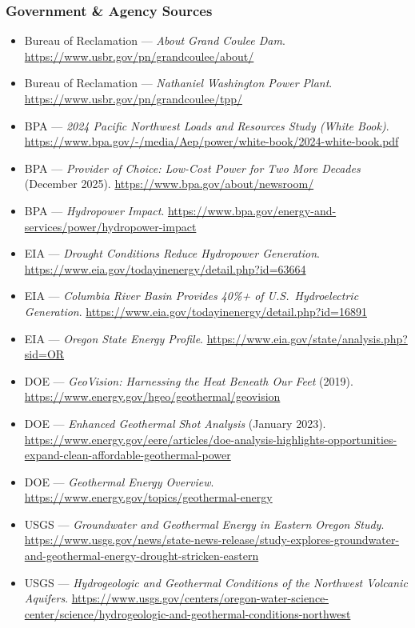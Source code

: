 \documentclass[11pt,letterpaper]{article}
\begin{document}
\subsubsection{Government \& Agency Sources}
\begin{itemize}[leftmargin=2em]
\item Bureau of Reclamation --- \textit{About Grand Coulee Dam}. \url{https://www.usbr.gov/pn/grandcoulee/about/}
\item Bureau of Reclamation --- \textit{Nathaniel Washington Power Plant}. \url{https://www.usbr.gov/pn/grandcoulee/tpp/}
\item BPA --- \textit{2024 Pacific Northwest Loads and Resources Study (White Book)}. \url{https://www.bpa.gov/-/media/Aep/power/white-book/2024-white-book.pdf}
\item BPA --- \textit{Provider of Choice: Low-Cost Power for Two More Decades} (December 2025). \url{https://www.bpa.gov/about/newsroom/}
\item BPA --- \textit{Hydropower Impact}. \url{https://www.bpa.gov/energy-and-services/power/hydropower-impact}
\item EIA --- \textit{Drought Conditions Reduce Hydropower Generation}. \url{https://www.eia.gov/todayinenergy/detail.php?id=63664}
\item EIA --- \textit{Columbia River Basin Provides 40\%+ of U.S.\ Hydroelectric Generation}. \url{https://www.eia.gov/todayinenergy/detail.php?id=16891}
\item EIA --- \textit{Oregon State Energy Profile}. \url{https://www.eia.gov/state/analysis.php?sid=OR}
\item DOE --- \textit{GeoVision: Harnessing the Heat Beneath Our Feet} (2019). \url{https://www.energy.gov/hgeo/geothermal/geovision}
\item DOE --- \textit{Enhanced Geothermal Shot Analysis} (January 2023). \url{https://www.energy.gov/eere/articles/doe-analysis-highlights-opportunities-expand-clean-affordable-geothermal-power}
\item DOE --- \textit{Geothermal Energy Overview}. \url{https://www.energy.gov/topics/geothermal-energy}
\item USGS --- \textit{Groundwater and Geothermal Energy in Eastern Oregon Study}. \url{https://www.usgs.gov/news/state-news-release/study-explores-groundwater-and-geothermal-energy-drought-stricken-eastern}
\item USGS --- \textit{Hydrogeologic and Geothermal Conditions of the Northwest Volcanic Aquifers}. \url{https://www.usgs.gov/centers/oregon-water-science-center/science/hydrogeologic-and-geothermal-conditions-northwest}

\end{itemize}
\end{document}
